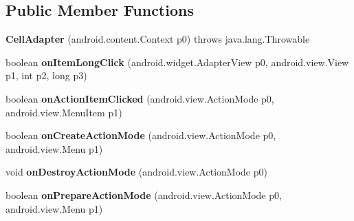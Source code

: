 \subsection*{Public Member Functions}
\begin{DoxyCompactItemize}
\item 
\mbox{\label{classmd5b60ffeb829f638581ab2bb9b1a7f4f3f_1_1CellAdapter_acc33c5de6c2168e85cfed4b8b631a7f7}} 
{\bfseries Cell\+Adapter} (android.\+content.\+Context p0)  throws java.\+lang.\+Throwable 	
\item 
\mbox{\label{classmd5b60ffeb829f638581ab2bb9b1a7f4f3f_1_1CellAdapter_a6315b61158f9e22013a511c7edd6bcdc}} 
boolean {\bfseries on\+Item\+Long\+Click} (android.\+widget.\+Adapter\+View p0, android.\+view.\+View p1, int p2, long p3)
\item 
\mbox{\label{classmd5b60ffeb829f638581ab2bb9b1a7f4f3f_1_1CellAdapter_a1febf1cc030736547768ae04d9ae8a8b}} 
boolean {\bfseries on\+Action\+Item\+Clicked} (android.\+view.\+Action\+Mode p0, android.\+view.\+Menu\+Item p1)
\item 
\mbox{\label{classmd5b60ffeb829f638581ab2bb9b1a7f4f3f_1_1CellAdapter_a4a8ad9014d454fbe0396726ba6b20b4b}} 
boolean {\bfseries on\+Create\+Action\+Mode} (android.\+view.\+Action\+Mode p0, android.\+view.\+Menu p1)
\item 
\mbox{\label{classmd5b60ffeb829f638581ab2bb9b1a7f4f3f_1_1CellAdapter_a2c4b1f2ec74b292e21fd9c665ba8ee1d}} 
void {\bfseries on\+Destroy\+Action\+Mode} (android.\+view.\+Action\+Mode p0)
\item 
\mbox{\label{classmd5b60ffeb829f638581ab2bb9b1a7f4f3f_1_1CellAdapter_a51d520fe6621a42e3dc8c690d1e763c0}} 
boolean {\bfseries on\+Prepare\+Action\+Mode} (android.\+view.\+Action\+Mode p0, android.\+view.\+Menu p1)
\item 
\mbox{\label{classmd5b60ffeb829f638581ab2bb9b1a7f4f3f_1_1CellAdapter_abe81186ab9094ff7ddd3f969e015a2e2}} 

\end{DoxyCompactItemize}
